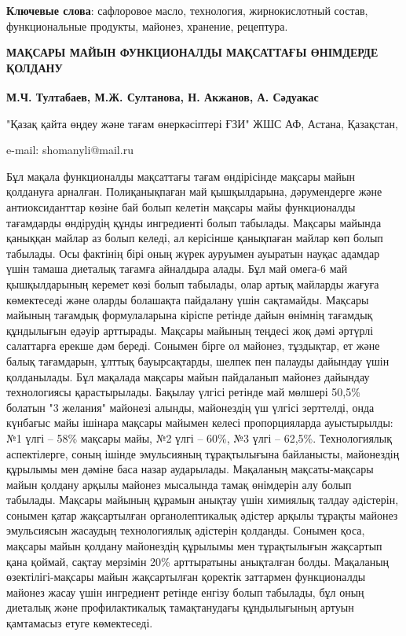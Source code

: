 {\bfseries Ключевые слова}: сафлоровое масло, технология, жирнокислотный
состав, функциональные продукты, майонез, хранение, рецептура.

\begin{articleheader}
{\bfseries МАҚСАРЫ МАЙЫН ФУНКЦИОНАЛДЫ МАҚСАТТАҒЫ ӨНІМДЕРДЕ ҚОЛДАНУ}

{\bfseries
М.Ч. Тултабаев\textsuperscript{\envelope },
М.Ж. Султанова,
Н. Акжанов,
А. Сәдуакас
}
\end{articleheader}

\begin{affiliation}
"Қазақ қайта өңдеу және тағам өнеркәсіптері ҒЗИ" ЖШС АФ, Астана, Қазақстан,

e-mail: shomanyli@mail.ru
\end{affiliation}

Бұл мақала функционалды мақсаттағы тағам өндірісінде мақсары майын
қолдануға арналған. Полиқанықпаған май қышқылдарына, дәрумендерге және
антиоксиданттар көзіне бай болып келетін мақсары майы функционалды
тағамдарды өндірудің құнды ингредиенті болып табылады. Мақсары майында
қаныққан майлар аз болып келеді, ал керісінше қанықпаған майлар көп
болып табылады. Осы фактінің бірі оның жүрек ауруымен ауыратын науқас
адамдар үшін тамаша диеталық тағамға айналдыра алады. Бұл май омега-6
май қышқылдарының керемет көзі болып табылады, олар артық майларды
жағуға көмектеседі және оларды болашақта пайдалану үшін сақтамайды.
Мақсары майының тағамдық формулаларына кіріспе ретінде дайын өнімнің
тағамдық құндылығын едәуір арттырады. Мақсары майының теңдесі жоқ дәмі
әртүрлі салаттарға ерекше дәм береді. Сонымен бірге ол майонез,
тұздықтар, ет және балық тағамдарын, ұлттық бауырсақтарды, шелпек пен
палауды дайындау үшін қолданылады. Бұл мақалада мақсары майын пайдаланып
майонез дайындау технологиясы қарастырылады. Бақылау үлгісі ретінде май
мөлшері 50,5\% болатын "3 желания" майонезі алынды, майонездің үш үлгісі
зерттелді, онда күнбағыс майы ішінара мақсары майымен келесі
пропорцияларда ауыстырылды: №1 үлгі -- 58\% мақсары майы, №2 үлгі --
60\%, №3 үлгі -- 62,5\%. Технологиялық аспектілерге, соның ішінде
эмульсияның тұрақтылығына байланысты, майонездің құрылымы мен дәміне
баса назар аударылады. Мақаланың мақсаты-мақсары майын қолдану арқылы
майонез мысалында тамақ өнімдерін алу болып табылады. Мақсары майының
құрамын анықтау үшін химиялық талдау әдістерін, сонымен қатар
жақсартылған органолептикалық әдістер арқылы тұрақты майонез эмульсиясын
жасаудың технологиялық әдістерін қолданды. Сонымен қоса, мақсары майын
қолдану майонездің құрылымы мен тұрақтылығын жақсартып қана қоймай,
сақтау мерзімін 20\% арттыратыны анықталған болды. Мақаланың
өзектілігі-мақсары майын жақсартылған қоректік заттармен функционалды
майонез жасау үшін ингредиент ретінде енгізу болып табылады, бұл оның
диеталық және профилактикалық тамақтанудағы құндылығының артуын
қамтамасыз етуге көмектеседі.

